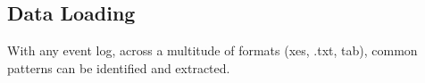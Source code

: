 \subsection{Data Loading}
With any event log, across a multitude of formats (xes, .txt, tab), common patterns can be identified and extracted.



